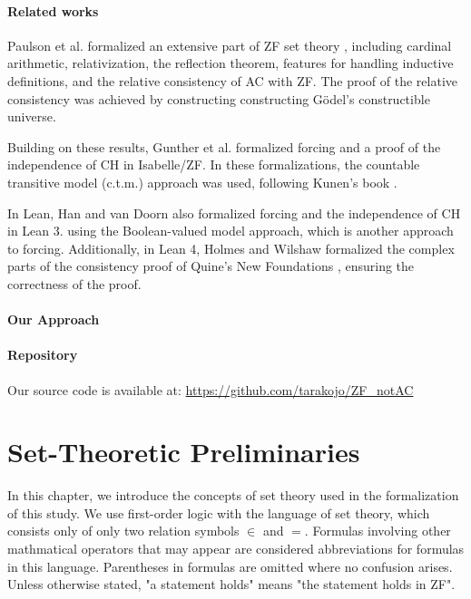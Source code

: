 \documentclass{report}
\begin{document}
\subsubsection{Related works}
Paulson et al. formalized an extensive part of ZF set theory 
\cite{paulson_datatype_impl,paulson_reflection,paulson_AC_consistency,paulson_cardinal_AC,paulson_datatype}
, including cardinal arithmetic, relativization, the reflection theorem, features for handling inductive definitions, and the relative consistency of AC with ZF.
The proof of the relative consistency was achieved by constructing constructing Gödel's constructible universe.

Building on these results, Gunther et al. formalized forcing and a proof of the independence of CH \cite{gunther_forcing,gunther_independence} in Isabelle/ZF.
In these formalizations, the countable transitive model (c.t.m.) approach was used, following Kunen's book \cite{kunen2011}.

In Lean, Han and van Doorn also formalized forcing and the independence of CH \cite{flypitch} in Lean 3.
using the Boolean-valued model approach, which is another approach to forcing.
Additionally, in Lean 4, Holmes and Wilshaw formalized the complex parts of the consistency proof of Quine's New Foundations \cite{NF_consistency}, ensuring the correctness of the proof.

\subsubsection{Our Approach}


\subsubsection{Repository}
Our source code is available at: \url{https://github.com/tarakojo/ZF_notAC}


 

\chapter{Set-Theoretic Preliminaries}
In this chapter, we introduce the concepts of set theory used in the formalization of this study.
We use first-order logic with the language of set theory, which consists only of only two relation symbols $\in$ and $=$. 
Formulas involving other mathmatical operators that may appear are considered abbreviations for formulas in this language.
Parentheses in formulas are omitted where no confusion arises.
Unless otherwise stated, "a statement holds" means "the statement holds in ZF".
\end{document}
